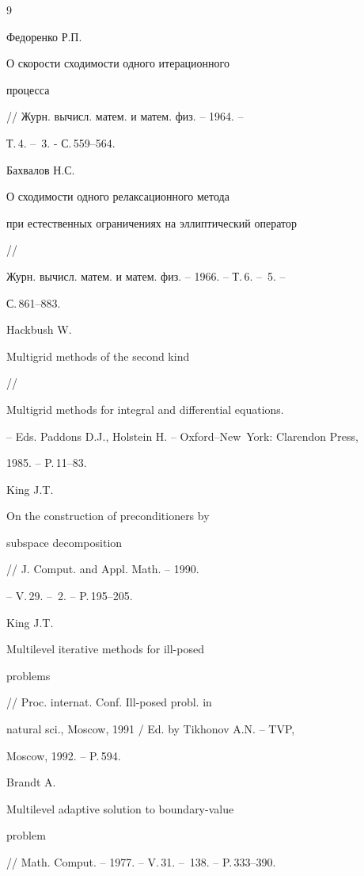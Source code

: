 \begin{thebibliography}{9}







Федоренко Р.П. {\em


О скорости сходимости одного итерационного


процесса} // Журн. вычисл. матем. и матем. физ. -- 1964. --


Т.\,4. -- \No\,3. - С.\,559--564.




Бахвалов Н.С. {\em


О сходимости одного релаксационного метода


при естественных ограничениях на эллиптический оператор} //


Журн. вычисл. матем. и матем. физ. -- 1966. -- Т.\,6. -- \No\,5. --


С.\,861--883.




Hackbush W. {\em


Multigrid methods of the second kind} //


Multigrid methods for integral and differential equations.


-- Eds. Paddons D.J., Holstein H. -- Oxford--New~York: Clarendon Press,


1985. -- P.\,11--83.




King J.T. {\em


On the construction of preconditioners by


subspace decomposition} // J. Comput. and Appl. Math. -- 1990.


-- V.\,29. -- \No\,2. -- P.\,195--205.




King J.T. {\em


Multilevel iterative methods for ill-posed


problems} // Proc. internat. Conf. Ill-posed probl. in


natural sci., Moscow, 1991 / Ed. by Tikhonov A.N. -- TVP,


Moscow, 1992. -- P.\,594.




Brandt A. {\em


Multilevel adaptive solution to boundary-value


problem} // Math. Comput. -- 1977. -- V.\,31. -- \No\,138. -- P.\,333--390.



\end{thebibliography}
